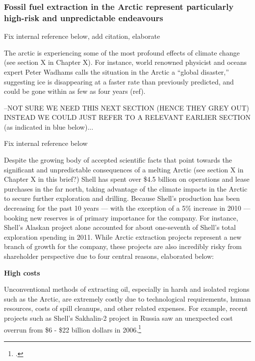 	\subsubsection{Fossil fuel extraction in the Arctic represent particularly high-risk and unpredictable endeavours}

	\begin{vcom}
		Fix internal reference below, add citation, elaborate
	\end{vcom}

The arctic is experiencing some of the most profound effects of climate change (see section X in Chapter X). 
For instance, world renowned physicist and oceans expert Peter Wadhams calls the situation in the Arctic a ``global disaster,'' suggesting ice is disappearing at a faster rate than previously predicted, and could be gone within as few as four years (ref). 



\begin{vcom}
–NOT SURE WE NEED THIS NEXT SECTION (HENCE THEY GREY OUT) INSTEAD WE COULD JUST REFER TO A RELEVANT EARLIER SECTION (as indicated in blue below)...
\end{vcom}

\begin{vcom}
	Fix internal reference below
\end{vcom}

Despite the growing body of accepted scientific facts that point towards the significant and unpredictable consequences of a melting Arctic (see section X in Chapter X in this brief?) Shell has spent over \$4.5 billion on operations and lease purchases in the far north, taking advantage of the climate impacts in the Arctic to secure further exploration and drilling. 
Because Shell's production has been decreasing for the past 10 years --- with the exception of a 5\% increase in 2010  --- booking new reserves is of primary importance for the company. 
For instance, Shell's Alaskan project alone accounted for about one-seventh of Shell's total exploration spending in 2011. 
While Arctic extraction projects represent a new branch of growth for the company, these projects are also incredibly risky from shareholder perspective due to four central reasons, elaborated below:

\textbf{High costs} 

Unconventional methods of extracting oil, especially in harsh and isolated regions such as the Arctic, are extremely costly due to technological requirements, human resources, costs of spill cleanups, and other related expenses. 
For example, recent projects such as Shell's Sakhalin-2 project in Russia saw an unexpected cost overrun from \$6 - \$22 billion dollars in 2006.\footcite[For more on these four central risk factors see][]{OutInTheCold_2012}

